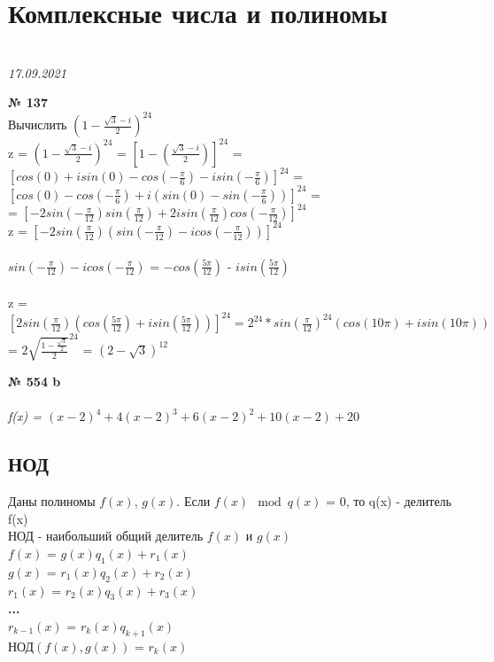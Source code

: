 \documentclass[12pt]{article}
\newenvironment{task}[1][0]{\vspace{.5cm} {\textbf{№ #1} \vspace{.5cm}\\ }}{}
\begin{document}
	
\section{Комплексные числа и полиномы}
	{\\ 
	\hfill \textit{17.09.2021}\\ \vspace{1cm}}

\begin{task}[137]
	{\large Вычислить $(1-\frac{\sqrt{3}-i}{2})^{24}$}\\
	z = {$(1-\frac{\sqrt{3}-i}{2})^{24}$ = $[1 - (\frac{\sqrt{3}-i}{2})]^{24}$ = $[cos(0)+isin(0)-cos(-\frac{\pi}{6})-isin(-\frac{\pi}{6})]^{24}$ = $[cos(0)-cos(-\frac{\pi}{6}) + i(sin(0) - sin(-\frac{\pi}{6}))]^{24}$ =\\= $[-2sin(-\frac{\pi}{12})sin(\frac{\pi}{12}) + 2isin(\frac{\pi}{12})cos(-\frac{\pi}{12})]^{24}$}\\
	z = $[-2sin(\frac{\pi}{12})(sin(-\frac{\pi}{12})-icos(-\frac{\pi}{12}))]^{24}$\\\\
	$sin(-\frac{\pi}{12})-icos(-\frac{\pi}{12})$ = $-cos(\frac{5\pi}{12})$ - $isin(\frac{5\pi}{12})$\\\\
	z = $[2sin(\frac{\pi}{12})(cos(\frac{5\pi}{12}) + isin(\frac{5\pi}{12}))]^{24}=2^{24}*sin(\frac{\pi}{12})^{24}(cos(10\pi)+isin(10\pi))$ = $2\sqrt{\frac{1-\frac{\sqrt{3}}{2}}{2}}^{24}$ = $(2-\sqrt{3})^{12}$
\end{task}

\vspace{1cm}
{
{\textbf{№ 554 b}\\ \vspace{.25cm}\\}
\textit{f(x) = $(x-2)^4+4(x-2)^3+6(x-2)^2+10(x-2)+20$}

}
\newpage
\subsection{НОД}
Даны полиномы $f(x)$, $g(x)$. Если $f(x)\mod{q(x)}$ = 0, то q(x) - делитель f(x)\\
НОД - наибольший общий делитель $f(x)$ и $g(x)$\\
$f(x)$ = $g(x)q_1(x)+r_1(x)$\\
$g(x)$ = $r_1(x)q_2(x)+r_2(x)$\\
$r_1(x)$ = $r_2(x)q_3(x)+r_3(x)$\\
\textbf{...}\\
$r_{k-1}(x)$ = $r_k(x)q_{k+1}(x)$\\
НОД$(f(x), g(x))$ = $r_k(x)$
\end{document}
